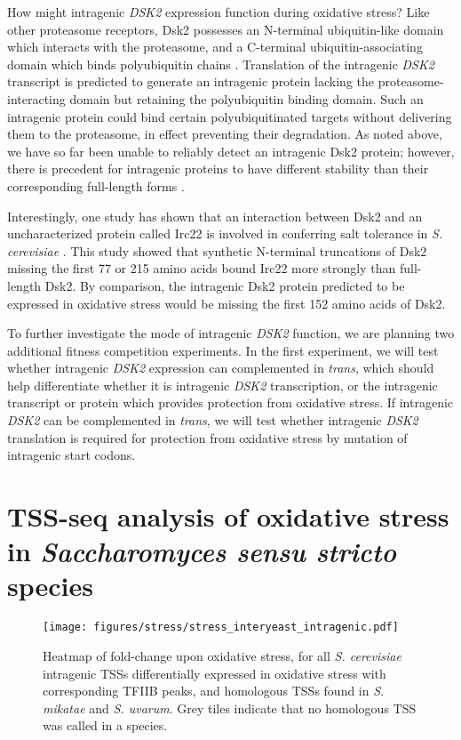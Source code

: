 How might intragenic \textit{DSK2} expression function during oxidative stress?
Like other proteasome receptors, Dsk2 possesses an N-terminal ubiquitin-like domain which interacts with the proteasome, and a C-terminal ubiquitin-associating domain which binds polyubiquitin chains \citep{funakoshi2002}.
Translation of the intragenic \textit{DSK2} transcript is predicted to generate an intragenic protein lacking the proteasome-interacting domain but retaining the polyubiquitin binding domain.
Such an intragenic protein could bind certain polyubiquitinated targets without delivering them to the proteasome, in effect preventing their degradation.
As noted above, we have so far been unable to reliably detect an intragenic Dsk2 protein; however, there is precedent for intragenic proteins to have different stability than their corresponding full-length forms \citep{gammie1999, benanti2009}.

Interestingly, one study has shown that an interaction between Dsk2 and an uncharacterized protein called Irc22 is involved in conferring salt tolerance in \textit{S. cerevisiae} \citep{ishii2014}.
This study showed that synthetic N-terminal truncations of Dsk2 missing the first 77 or 215 amino acids bound Irc22 more strongly than full-length Dsk2.
By comparison, the intragenic Dsk2 protein predicted to be expressed in oxidative stress would be missing the first 152 amino acids of Dsk2.

To further investigate the mode of intragenic \textit{DSK2} function, we are planning two additional fitness competition experiments.
In the first experiment, we will test whether intragenic \textit{DSK2} expression can complemented in \textit{trans}, which should help differentiate whether it is intragenic \textit{DSK2} transcription, or the intragenic transcript or protein which provides protection from oxidative stress.
If intragenic \textit{DSK2} can be complemented in \textit{trans}, we will test whether intragenic \textit{DSK2} translation is required for protection from oxidative stress by mutation of intragenic start codons.

\section[TSS-seq analysis of oxidative stress\\ in \textit{Saccharomyces sensu stricto} species]{TSS-seq analysis of oxidative stress in \textit{Saccharomyces sensu stricto} species}

\begin{figure}[h]
    \texttt{[image: figures/stress/stress\_interyeast\_intragenic.pdf]}
    \caption[Heatmap of fold-change upon oxidative stress, for \textit{S. cerevisiae} intragenic TSSs differentially expressed in oxidative stress, and homologous TSSs found in \textit{S. mikatae} and \textit{S. uvarum}.]{Heatmap of fold-change upon oxidative stress, for all \textit{S. cerevisiae} intragenic TSSs differentially expressed in oxidative stress with corresponding TFIIB peaks, and homologous TSSs found in \textit{S. mikatae} and \textit{S. uvarum}. Grey tiles indicate that no homologous TSS was called in a species.}
    \label{fig:stress_interyeast_intragenic}
\end{figure}

